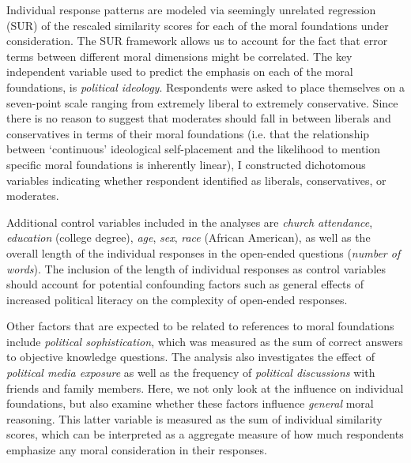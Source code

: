 \documentclass[12pt]{article}
\begin{document}
Individual response patterns are modeled via seemingly unrelated regression (SUR) of the rescaled similarity scores for each of the moral foundations under consideration. The SUR framework allows us to account for the fact that error terms between different moral dimensions might be correlated. The key independent variable used to predict the emphasis on each of the moral foundations, is \textit{political ideology}. Respondents were asked to place themselves on a seven-point scale ranging from extremely liberal to extremely conservative. Since there is no reason to suggest that moderates should fall in between liberals and conservatives in terms of their moral foundations (i.e. that the relationship between `continuous' ideological self-placement and the likelihood to mention specific moral foundations is inherently linear), I constructed dichotomous variables indicating whether respondent identified as liberals, conservatives, or moderates.

Additional control variables included in the analyses are \textit{church attendance}, \textit{education} (college degree), \textit{age}, \textit{sex}, \textit{race} (African American), as well as the overall length of the individual responses in the open-ended questions (\textit{number of words}). The inclusion of the length of individual responses as control variables should account for potential confounding factors such as general effects of increased political literacy on the complexity of open-ended responses.

Other factors that are expected to be related to references to moral foundations include \textit{political sophistication}, which was measured as the sum of correct answers to objective knowledge questions. The analysis also investigates the effect of \textit{political media exposure} as well as the frequency of \textit{political discussions} with friends and family members. Here, we not only look at the influence on individual foundations, but also examine whether these factors influence \textit{general} moral reasoning. This latter variable is measured as the sum of individual similarity scores, which can be interpreted as a aggregate measure of how much respondents emphasize any moral consideration in their responses.
\end{document}
